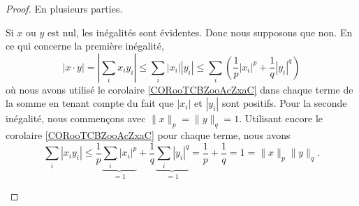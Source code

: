 \begin{proof}
	En plusieurs parties.
	\begin{subproof}
		Si \( x\) ou \( y\) est nul, les inégalités sont évidentes. Donc nous supposons que non.
		En ce qui concerne la première inégalité,
		\begin{equation}
			| x\cdot y |=| \sum_ix_iy_i |\leq \sum_i| x_i | |y_i |\leq \sum_i\left( \frac{1}{ p }| x_i |^p+\frac{1}{ q }| y_i |^q \right)
		\end{equation}
		où nous avons utilisé le corolaire \ref{CORooTCBZooAcZxaC} dans chaque terme de la somme en tenant compte du fait que \( | x_i |\) et \( | y_i |\) sont positifs.
		Pour la seconde inégalité, nous commençons avec \( \| x \|_p=\| y \|_q=1\). Utilisant encore le corolaire \ref{CORooTCBZooAcZxaC} pour chaque terme, nous avons
		\begin{equation}
			\sum_i| x_iy_i |\leq\frac{1}{ p }\underbrace{\sum_i| x_i |^p}_{=1}+\frac{1}{ q }\underbrace{\sum_i| y_i |^q}_{=1}=\frac{1}{ p }+\frac{1}{ q }=1=\| x \|_p\| y \|_q.
		\end{equation}


\end{subproof}
\end{proof}
